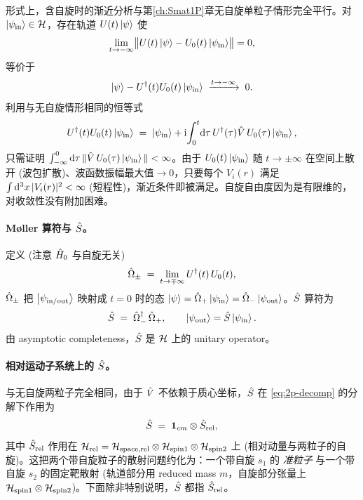 形式上，含自旋时的渐近分析与第\ref{ch:Smat1P}章无自旋单粒子情形完全平行。对 $\ket{\psi_{\rm in}}\in\mathcal{H}$，存在轨道 $U(t)\ket\psi$ 使
\begin{equation}
  \lim_{t\to-\infty}\bigl\| U(t)\ket\psi - U_0(t)\ket{\psi_{\rm in}}\bigr\| = 0,
  \label{eq:asym-cond-spin}
\end{equation}
等价于
\begin{equation}
  \ket{\psi}-U^\dagger(t)U_0(t)\ket{\psi_{\rm in}}\;\xrightarrow{t\to-\infty}\;0.
\end{equation}
利用与无自旋情形相同的恒等式
\begin{equation}
  U^\dagger(t)U_0(t)\ket{\psi_{\rm in}}
  \;=\; \ket{\psi_{\rm in}} + \mathrm{i}\!\int_0^{t}\!\mathrm{d}\tau\,U^\dagger(\tau)\hat{V}\,U_0(\tau)\ket{\psi_{\rm in}},
  \label{eq:dyson-asym}
\end{equation}
只需证明 $\int_{-\infty}^{0}\mathrm{d}\tau\,\|\hat{V}\,U_0(\tau)\ket{\psi_{\rm in}}\|<\infty$。由于 $U_0(t)\ket{\psi_{\rm in}}$ 随 $t\to\pm\infty$ 在空间上散开 (波包扩散)、波函数振幅最大值$\to 0$，只要每个 $V_i(r)$ 满足 $\int\mathrm{d}^3 x\,|V_i(r)|^2<\infty$ (短程性)，渐近条件即被满足。自旋自由度因为是有限维的，对收敛性没有附加困难。

\paragraph{Møller 算符与 $\hat{S}$。}定义 (注意 $\hat{H}_0$ 与自旋无关)
\begin{equation}
  \hat{\Omega}_\pm \;=\; \lim_{t\to\mp\infty}U^\dagger(t)\,U_0(t),
  \label{eq:moller-spin}
\end{equation}
$\hat{\Omega}_\pm$ 把 $\ket{\psi_{\rm in/out}}$ 映射成 $t=0$ 时的态 $\ket\psi=\hat{\Omega}_+\ket{\psi_{\rm in}}=\hat{\Omega}_-\ket{\psi_{\rm out}}$。$\hat{S}$ 算符为
\begin{equation}
  \hat{S} \;=\; \hat{\Omega}_-^\dagger\,\hat{\Omega}_+,\qquad
  \ket{\psi_{\rm out}}=\hat{S}\ket{\psi_{\rm in}}.
  \label{eq:Smat-def-spin}
\end{equation}
由 asymptotic completeness，$\hat{S}$ 是 $\mathcal{H}$ 上的 unitary operator。

\paragraph{相对运动子系统上的 $\hat{S}$。}与无自旋两粒子完全相同，由于 $\hat{V}$ 不依赖于质心坐标，$\hat{S}$ 在 \eqref{eq:2p-decomp} 的分解下作用为
\begin{equation}
  \hat{S} \;=\; \mathbf 1_{cm}\otimes \hat{S}_{\rm rel},
  \label{eq:S-cm-rel}
\end{equation}
其中 $\hat{S}_{\rm rel}$ 作用在 $\mathcal{H}_{\rm rel}=\mathcal{H}_{\rm space,rel}\otimes\mathcal{H}_{\rm spin1}\otimes\mathcal{H}_{\rm spin2}$ 上 (相对动量与两粒子的自旋)。这把两个带自旋粒子的散射问题约化为：一个带自旋 $s_1$ 的 \emph{准粒子} 与一个带自旋 $s_2$ 的固定靶散射 (轨道部分用 reduced mass $m$，自旋部分张量上 $\mathcal{H}_{\rm spin1}\otimes\mathcal{H}_{\rm spin2}$)。下面除非特别说明，$\hat{S}$ 都指 $\hat{S}_{\rm rel}$。

